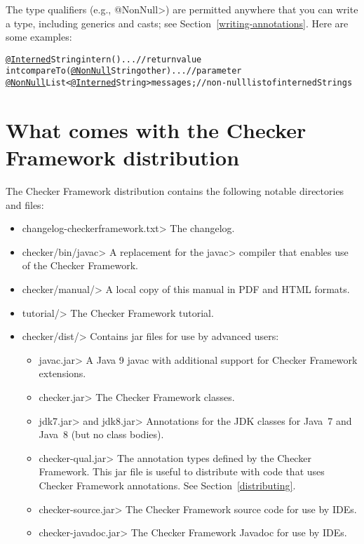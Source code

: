 The type qualifiers (e.g., \<@NonNull>) are permitted anywhere
that you can write a type, including generics and casts; see
Section~\ref{writing-annotations}.  Here are some examples:

\begin{alltt}
  \underline{@Interned} String intern() \ttlcb{} ... \ttrcb{}             // return value
  int compareTo(\underline{@NonNull} String other) \ttlcb{} ... \ttrcb{}  // parameter
  \underline{@NonNull} List<\underline{@Interned} String> messages;     // non-null list of interned Strings
\end{alltt}


\section{What comes with the Checker Framework distribution\label{release-content}}

The Checker Framework distribution contains the following notable
directories and files:

\begin{itemize}
\item \<changelog-checkerframework.txt> The changelog.
\item \<checker/bin/javac> A replacement for the \<javac> compiler that
  enables use of the Checker Framework.
\item \<checker/manual/> A local copy of this manual in PDF and HTML formats.
\item \<tutorial/> The Checker Framework tutorial.
\item \<checker/dist/> Contains jar files for use by advanced users:
  \begin{itemize}
  \item \<javac.jar> A Java 9 javac with additional support for
  Checker Framework extensions.
  \item \<checker.jar> The Checker Framework classes.
  \item \<jdk7.jar> and \<jdk8.jar> Annotations for the JDK classes for
  Java~7 and Java~8 (but no class bodies).
  \item \<checker-qual.jar> The annotation types defined by the
  Checker Framework. This jar file is useful to distribute with code
  that uses Checker Framework annotations. See Section~\ref{distributing}.
  \item \<checker-source.jar> The Checker Framework source code for
  use by IDEs.
  \item \<checker-javadoc.jar> The Checker Framework Javadoc for use
  by IDEs.
  \end{itemize}
\end{itemize}

